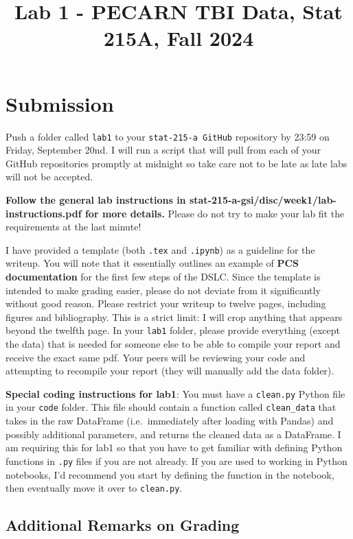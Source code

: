 \documentclass[10pt,letterpaper]{article}
\title{Lab 1 - PECARN TBI Data, Stat 215A, Fall 2024\vspace{-2em}}
\begin{document}
\maketitle

\section*{Submission}
Push a folder called \texttt{lab1} to your \texttt{stat-215-a GitHub} repository by 23:59 on Friday, September 20nd. I will run a script that will pull from each of your GitHub repositories promptly at midnight so take care not to be late as late labs will not be accepted.

\textbf{Follow the general lab instructions in stat-215-a-gsi/disc/week1/lab-instructions.pdf for more details.} Please do not try to make your lab fit the requirements at the last minute!

I have provided a template (both \texttt{.tex} and \texttt{.ipynb}) as a guideline for the writeup. You will note that it essentially outlines an example of \textbf{PCS documentation} for the first few steps of the DSLC. Since the template is intended to make grading easier, please do not deviate from it significantly without good reason. Please restrict your writeup to twelve pages, including figures and bibliography. This is a strict limit: I will crop anything that appears beyond the twelfth page. In your \texttt{lab1} folder, please provide everything (except the data) that is needed for someone else to be able to compile your report and receive the exact same pdf. Your peers will be reviewing your code and attempting to recompile your report (they will manually add the data folder).

\textbf{Special coding instructions for lab1}: You must have a \texttt{clean.py} Python file in your \texttt{code} folder. This file should contain a function called \texttt{clean\_data} that takes in the raw DataFrame (i.e.~immediately after loading with Pandas) and possibly additional parameters, and returns the cleaned data as a DataFrame. I am requiring this for lab1 so that you have to get familiar with defining Python functions in \texttt{.py} files if you are not already. If you are used to working in Python notebooks, I'd recommend you start by defining the function in the notebook, then eventually move it over to \texttt{clean.py}.

\subsection*{Additional Remarks on Grading}
\end{document}
